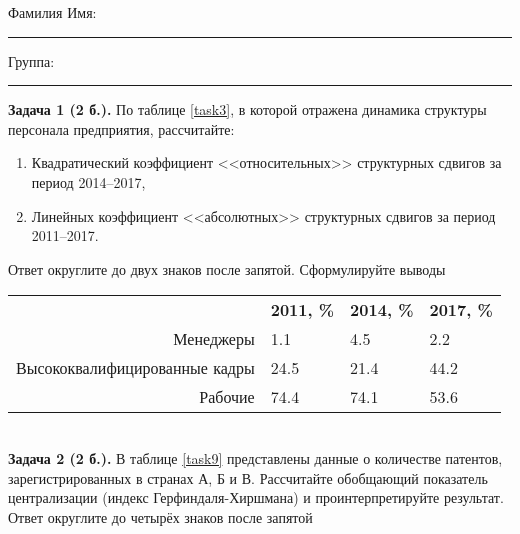 \documentclass{article}
\begin{document}
\mbox{}

\vspace{-36pt}

\begin{center}
	\begin{tcolorbox}[colback=white, boxrule=0.20ex, sharp corners = all, height=25pt, colframe=black, valign=top]
		\begin{center}
			Фамилия Имя:\hspace{1.5pt}\rule{190pt}{0pt}\hspace{50pt}Группа:\hspace{1.5pt}\rule{60pt}{0pt}
		\end{center}
	\end{tcolorbox}
\end{center}
\vspace{3pt}

\textbf{Задача 1 (2 б.).} По таблице \ref{task3}, в которой отражена динамика структуры персонала предприятия, рассчитайте:
\begin{enumerate}[leftmargin=40pt]
\item Квадратический коэффициент <<относительных>> структурных сдвигов за период 2014--2017,
\item Линейных коэффициент <<абсолютных>> структурных сдвигов за период 2011--2017.\medskip
\end{enumerate}

Ответ округлите до двух знаков после запятой. Сформулируйте выводы\\

\begin{minipage}{\textwidth}
\centering
\begin{tabularx}{0.8\textwidth}{rYYY}
\toprule
 & \textbf{2011, \%} & \textbf{2014, \%} & \textbf{2017, \%} \\
\cmidrule(lr){2-2}\cmidrule(lr){3-3}\cmidrule(lr){4-4}
Менеджеры & 1.1 & 4.5 & 2.2 \\

Высококвалифицированные кадры & 24.5 & 21.4 & 44.2 \\

Рабочие & 74.4 & 74.1 & 53.6 \\
\bottomrule
\end{tabularx}
\label{task3}
\end{minipage} \\[35pt]

\textbf{Задача 2 (2 б.).} В таблице \ref{task9} представлены данные о количестве патентов, зарегистрированных в странах А, Б и В. Рассчитайте обобщающий показатель централизации (индекс Герфиндаля-Хиршмана) и проинтерпретируйте результат. Ответ округлите до четырёх знаков после запятой\\
\end{document}
